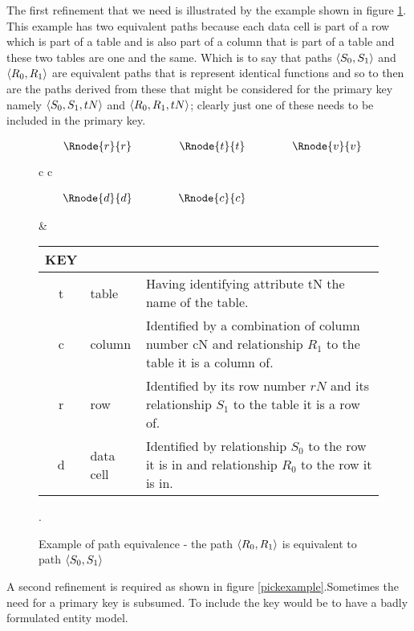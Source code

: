 \documentclass[10pt,a4paper]{article}
\begin{document}
 The first refinement that we need is illustrated by the example shown in figure
\ref{datatablegraph}. This example has two equivalent paths because 
each data cell is part of a row which is part of a table and is also part 
of a column that is part of a table and these two tables are one and the same.
Which is to say that paths $\langle S_0,S_1\rangle$ and $\langle R_0,R_1\rangle$ are equivalent 
paths that is represent identical functions and so to then are the paths
derived from these that might be considered for the primary key namely
$\langle S_0,S_1,tN\rangle$ and $\langle R_0,R_1,tN\rangle$; clearly just one of these needs
to be included in the primary key. 
\begin{figure} [H] %
\begin{center}
\begin{tabular}{c c}
$
\begin{array}{cp{0.75cm}cp{0.75cm}c}
   \Rnode{r}{r}     & & \Rnode{t}{t} & & \Rnode{v}{v} \\[1.2cm]     
	 \Rnode{d}{d}   & & \Rnode{c}{c} & &               
\end{array}
$
\idcomp
{} 
\idcomp
{} 
\idcomp
{}
\idcomp
{}
\idcomp
{}
\idcomp
{}
\idcomp

& \footnotesize
\begin{tabular}{c p{1.5cm} p{4cm}}
KEY && \\
\hline
t & table & Having identifying attribute tN the name of the table. \\
c & column & Identified by a combination of column number cN and relationship $R_1$ to the table it is a column of.\\
r & row & Identified by its row number $rN$ and its relationship $S_1$ to the table it is a row of.\\
d & data cell & Identified by relationship $S_0$ to the row it is in and relationship $R_0$ to the row it is in. \\
\end{tabular} 
\end{tabular}
\end{center}
\caption{Example of path equivalence - the path $\langle R_0,R_1\rangle$ is equivalent to path $\langle S_0,S_1\rangle$}.
\label{datatablegraph}
\end{figure}

A second refinement is required as shown in figure \ref{pickexample}.Sometimes
the need for a primary key is subsumed. To include the key would be to 
have a badly formulated entity model.
\end{document}
